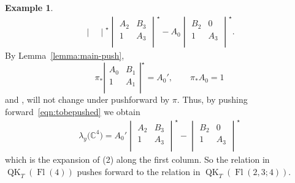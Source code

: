 \documentclass[pdftex]{sigma}
\numberwithin{equation}{section}
\theoremstyle{definition}
\newtheorem{Example}[Theorem]{Example}
\DeclareMathOperator{\Fl}{Fl}
\DeclareMathOperator{\QK}{QK}
\begin{document}
\begin{Example}
\begin{gather}
\begin{vmatrix}
 \end{vmatrix}^\star \begin{vmatrix}
 A_2 & B_3 \\
 1 & A_3 \\
 \end{vmatrix}^\star -A_0 \begin{vmatrix}
 B_2 & 0 \\
 1 & A_3 \\
 \end{vmatrix}^\star.
\end{gather}
By Lemma~\ref{lemma:main-push},
\[
\pi_*\left|\begin{matrix}
 A_0 & B_1 \\
 1 & A_1 \\
 \end{matrix}\right|^\star = A_0' , \qquad \pi_*A_0=1
 \]
and , 
 will not change under pushforward by $\pi$. Thus, by pushing forward~\eqref{eqn:tobepushed} we obtain
 \begin{gather*}
 \lambda_y\bigl(\mathbb{C}^4\bigr)=A_0' \begin{vmatrix}
 A_2 & B_3 \\
 1 & A_3 \\
 \end{vmatrix}^\star - \begin{vmatrix}
 B_2 & 0 \\
 1 & A_3 \\
 \end{vmatrix}^\star
\end{gather*}
which is the expansion of (2) along the first column. So the relation in $\QK_T(\Fl(4))$ pushes forward to the relation in $\QK_T(\Fl(2,3;4))$.


\end{Example}
\end{document}
